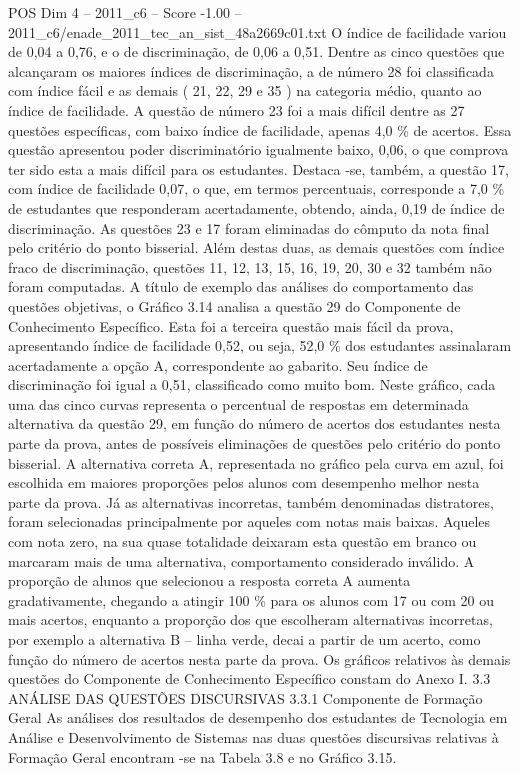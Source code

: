 \begin{textsample}{POS Dim 4 – 2011\_c6 – Score -1.00 – 2011\_c6/enade\_2011\_tec\_an\_sist\_48a2669c01.txt}
O índice de facilidade variou de 0,04 a 0,76, e o de discriminação, de 0,06 a 0,51.
Dentre as cinco questões que alcançaram os maiores índices de discriminação, a de número 28 foi classificada com índice fácil e as demais ( 21, 22, 29 e 35 ) na categoria médio, quanto ao índice de facilidade.
A questão de número 23 foi a mais difícil dentre as 27 questões específicas, com baixo índice de facilidade, apenas 4,0 \% de acertos.
Essa questão apresentou poder discriminatório igualmente baixo, 0,06, o que comprova ter sido esta a mais difícil para os estudantes.
Destaca -se, também, a questão 17, com índice de facilidade 0,07, o que, em termos percentuais, corresponde a 7,0 \% de estudantes que responderam acertadamente, obtendo, ainda, 0,19 de índice de discriminação.
As questões 23 e 17 foram eliminadas do cômputo da nota final pelo critério do ponto bisserial.
Além destas duas, as demais questões com índice fraco de discriminação, questões 11, 12, 13, 15, 16, 19, 20, 30 e 32 também não foram computadas.
A título de exemplo das análises do comportamento das questões objetivas, o Gráfico 3.14 analisa a questão 29 do Componente de Conhecimento Específico.
Esta foi a terceira questão mais fácil da prova, apresentando índice de facilidade 0,52, ou seja, 52,0 \% dos estudantes assinalaram acertadamente a opção A, correspondente ao gabarito.
Seu índice de discriminação foi igual a 0,51, classificado como muito bom.
Neste gráfico, cada uma das cinco curvas representa o percentual de respostas em determinada alternativa da questão 29, em função do número de acertos dos estudantes nesta parte da prova, antes de possíveis eliminações de questões pelo critério do ponto bisserial.
A alternativa correta A, representada no gráfico pela curva em azul, foi escolhida em maiores proporções pelos alunos com desempenho melhor nesta parte da prova.
Já as alternativas incorretas, também denominadas distratores, foram selecionadas principalmente por aqueles com notas mais baixas.
Aqueles com nota zero, na sua quase totalidade deixaram esta questão em branco ou marcaram mais de uma alternativa, comportamento considerado inválido.
A proporção de alunos que selecionou a resposta correta A aumenta gradativamente, chegando a atingir 100 \% para os alunos com 17 ou com 20 ou mais acertos, enquanto a proporção dos que escolheram alternativas incorretas, por exemplo a alternativa B – linha verde, decai a partir de um acerto, como função do número de acertos nesta parte da prova.
Os gráficos relativos às demais questões do Componente de Conhecimento Específico constam do Anexo I. 3.3 ANÁLISE DAS QUESTÕES DISCURSIVAS 3.3.1 Componente de Formação Geral As análises dos resultados de desempenho dos estudantes de Tecnologia em Análise e Desenvolvimento de Sistemas nas duas questões discursivas relativas à Formação Geral encontram -se na Tabela 3.8 e no Gráfico 3.15.

\end{textsample}
